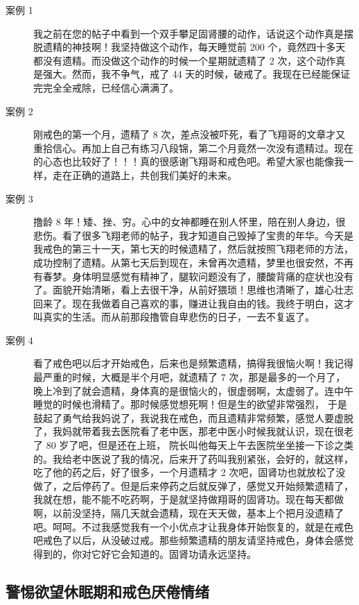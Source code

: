 \documentclass[fontset=founder]{ctexart}
\begin{document}
\begin{description}
    \item[案例 1] 我之前在您的帖子中看到一个双手攀足固肾腰的动作，话说这个动作真是摆脱遗精的神技啊！我坚持做这个动作，每天睡觉前 200 个，竟然四十多天都没有遗精。而没做这个动作的时候一个星期就遗精了 2 次，这个动作真是强大。然而，我不争气，戒了 44 天的时候，破戒了。我现在已经能保证完完全全戒除，已经信心满满了。
    \item[案例 2] 刚戒色的第一个月，遗精了 8 次，差点没被吓死，看了飞翔哥的文章才又重拾信心。再加上自己有练习八段锦，第二个月竟然一次没有遗精过。现在的心态也比较好了！！！真的很感谢飞翔哥和戒色吧。希望大家也能像我一样，走在正确的道路上，共创我们美好的未来。
    \item[案例 3] 撸龄 8 年！矮、挫、穷。心中的女神都睡在别人怀里，陪在别人身边，很悲伤。看了很多飞翔老师的帖子，我才知道自己毁掉了宝贵的年华。今天是我戒色的第三十一天，第七天的时候遗精了，然后就按照飞翔老师的方法，成功控制了遗精。从第七天后到现在，未曾再次遗精，梦里也很安然，不再有春梦。身体明显感觉有精神了，腿软问题没有了，腰酸背痛的症状也没有了。面貌开始清晰，看上去很干净，从前好猥琐！思维也清晰了，雄心壮志回来了。现在我做着自己喜欢的事，赚进让我自由的钱。我终于明白，这才叫真实的生活。而从前那段撸管自卑悲伤的日子，一去不复返了。
    \item[案例 4] 看了戒色吧以后才开始戒色，后来也是频繁遗精，搞得我很恼火啊！我记得最严重的时候，大概是半个月吧，就遗精了 7 次，那是最多的一个月了，晚上冷到了就会遗精，身体真的是很恼火的，很虚弱啊，太虚弱了。连中午睡觉的时候也滑精了。那时候感觉想死啊！但是生的欲望非常强烈， 于是鼓起了勇气给我妈说了，我说我在戒色，而且遗精非常频繁，感觉人要虚脱了，我妈就带着我去医院看了老中医，那老中医小时候我就认识，现在很老了 80 岁了吧，但是还在上班， 院长叫他每天上午去医院坐坐接一下诊之类的。我给老中医说了我的情况，后来开了药叫我别紧张，会好的，就这样，吃了他的药之后，好了很多，一个月遗精才 2 次吧，固肾功也就放松了没做了，之后停药了。但是后来停药之后就反弹了，感觉又开始频繁遗精了，我就在想，能不能不吃药啊，于是就坚持做翔哥的固肾功。现在每天都做啊，以前没坚持，隔几天就会遗精，现在天天做，基本上个把月没遗精了吧。呵呵。不过我感觉我有一个小优点才让我身体开始恢复的，就是在戒色吧戒色了以后，从没破过戒。那些频繁遗精的朋友请坚持戒色，身体会感觉得到的，你对它好它会知道的。固肾功请永远坚持。
\end{description}

\subsection{警惕欲望休眠期和戒色厌倦情绪}
\end{document}

